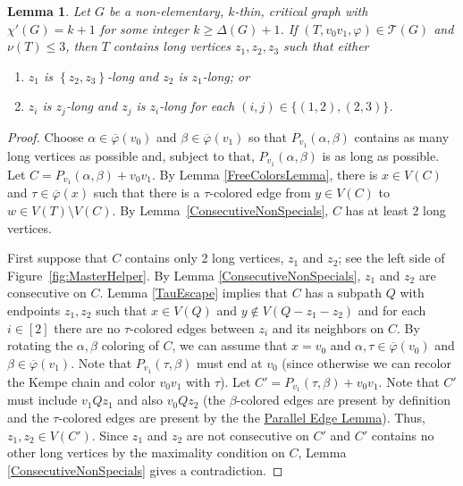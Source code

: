\documentclass[12pt]{article}
\theoremstyle{plain}
\newtheorem{lem}[thm]{Lemma}
\theoremstyle{definition}
\theoremstyle{remark}
\newcommand{\fancy}[1]{\mathcal{#1}}
\newcommand{\T}{\fancy{T}}
\newcommand{\set}[1]{\left\{ #1 \right\}}
\newcommand{\irange}[1]{\left[#1\right]}
\newcommand{\vph}{\varphi}
\newcommand{\vphn}{\overline{\varphi}}
\begin{document}
\begin{lem}\label{MasterHelper}
Let $G$ be a non-elementary, $k$-thin, critical graph with $\chi'(G) = k+1$ for
some integer $k \ge \Delta(G) + 1$.  If $(T, v_0v_1, \vph) \in \T(G)$ and
$\nu(T) \le 3$, then $T$ contains long vertices $z_1,z_2,z_3$ such that either 
\begin{enumerate}
\item $z_1$ is $\set{z_2,z_3}$-long and $z_2$ is $z_1$-long; or
\item $z_i$ is $z_j$-long and $z_j$ is $z_i$-long for each %
$(i,j)\in\{(1,2),(2,3)\}$.
\end{enumerate}
\end{lem}
\begin{proof}
Choose $\alpha \in \vphn(v_0)$ and $\beta \in \vphn(v_1)$ so that
$P_{v_1}(\alpha, \beta)$ contains as many long vertices as possible and,
subject to that, $P_{v_1}(\alpha,\beta)$ is as long as possible.
Let $C=P_{v_1}(\alpha,\beta)+v_0v_1$.
By Lemma \ref{FreeColorsLemma}, there is $x \in V(C)$ and $\tau \in \vphn(x)$
such that there is a $\tau$-colored edge from $y \in V(C)$ to $w \in V(T)
\setminus V(C)$.  By Lemma~\ref{ConsecutiveNonSpecials}, $C$ has at least 2
long vertices.

First suppose that $C$ contains only 2 long vertices, $z_1$ and $z_2$; see the
left side of Figure~\ref{fig:MasterHelper}.  By
Lemma \ref{ConsecutiveNonSpecials}, $z_1$ and $z_2$ are consecutive on $C$.
Lemma \ref{TauEscape} implies that $C$ has a subpath $Q$ 
with endpoints $z_1,z_2$ such that $x \in V(Q)$ and $y \not \in V(Q-z_1-z_2)$ 
and for each $i \in \irange{2}$ 
there are no $\tau$-colored edges between $z_i$ and its neighbors on $C$.
%
By rotating the $\alpha,\beta$ coloring of $C$, we can assume that $x = v_0$ and
$\alpha,\tau\in \vphn(v_0)$ and $\beta\in\vphn(v_1)$. 
Note that $P_{v_1}(\tau,\beta)$ must end at $v_0$ (since otherwise we can
recolor the Kempe chain and color $v_0v_1$ with $\tau$).  
Let $C' = P_{v_1}(\tau, \beta) + v_0v_1$.  Note that $C'$ must include $v_1Qz_1$
and also $v_0Qz_2$ (the $\beta$-colored edges are present by definition and the
$\tau$-colored edges are present by the 
the \hyperref[SpecialPath]{Parallel Edge Lemma}).  
Thus, $z_1,z_2\in
V(C')$.  Since $z_1$ and $z_2$ are not consecutive on $C'$
and $C'$ contains no other long vertices by the maximality condition on $C$,
Lemma \ref{ConsecutiveNonSpecials} gives a contradiction.


\end{proof}
\end{document}
